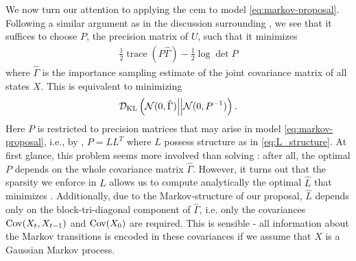 We now turn our attention to applying the \gls{cem} to model \eqref{eq:markov-proposal}. Following a similar argument as in the discussion surrounding , we see that it suffices to choose $P$, the precision matrix of $U$, such that it minimizes
\begin{align}
\label{eq:markov_ce_target}
\frac{1}{2} \operatorname{trace} \left( P \hat\Gamma \right) - \frac{1}{2}\log\det P
\end{align}
where $\hat\Gamma$ is the importance sampling estimate of the joint covariance matrix of all states $X$. This is equivalent to minimizing 
$$
\mathcal D_{\text{KL}} \left(\mathcal N(0,\hat\Gamma) \middle|\middle| \mathcal N(0, P^{-1})\right).
$$
Here $P$ is restricted to precision matrices that may arise in model \eqref{eq:markov-proposal}, i.e., by , $P = LL^{T}$ where $L$ possess structure as in \eqref{eq:L_structure}. 
At first glance, this problem seems more involved than solving : after all, the optimal $P$ depends on the whole covariance matrix $\hat\Gamma$. 
However, it turns out that the sparsity we enforce in $L$ allows us to compute analytically the optimal $\hat L$  that minimizes 
. Additionally, due to the Markov-structure of our proposal, $\hat L$ depends only on the block-tri-diagonal component of $\hat \Gamma$, i.e. only the covariances $\operatorname{Cov}(X_{t}, X_{t-1})$ and $\operatorname{Cov} (X_{0})$ are required. This is sensible - all information about the Markov transitions is encoded in these covariances if we assume that $X$ is a Gaussian Markov process.

